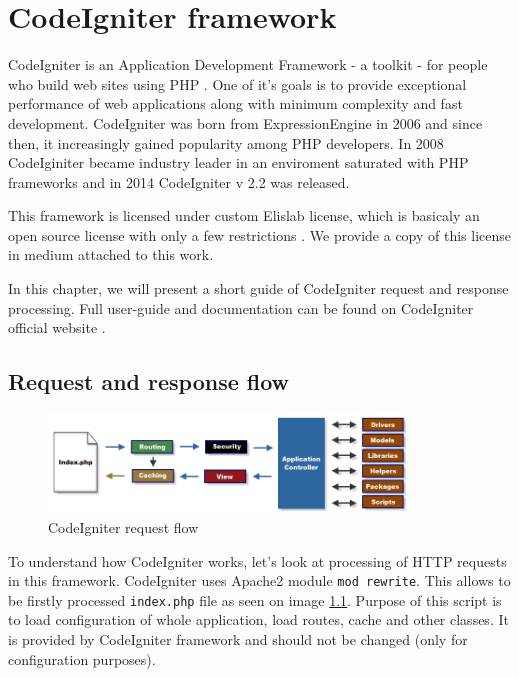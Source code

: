 \chapter{CodeIgniter framework}



CodeIgniter is an Application Development Framework - a toolkit - for people who build web sites using PHP  \cite{codeigniter}. One of it's goals is to provide exceptional performance of web applications along with minimum complexity and fast development. CodeIgniter was born from ExpressionEngine \cite{elislab} in 2006 and since then, it increasingly gained popularity among PHP developers. In 2008 CodeIginiter became industry leader in an enviroment saturated with PHP frameworks \cite{elislab} and in 2014 CodeIgniter v 2.2 was released.


This framework is licensed under custom Elislab license, which is basicaly an open source license with only a few restrictions \cite{elislablicense}. We provide a copy of this license in medium attached to this work.


In this chapter, we will present a short guide of CodeIgniter request and response processing. Full user-guide and documentation can be found on CodeIgniter official website \cite{codeigniter}.

\section{Request and response flow}

\begin{figure}[h]
    \centering
    \includegraphics[width=0.85\textwidth]{images/codeigniter.png}
    \caption{CodeIgniter request flow}
    \label{codeigniter_flow}
\end{figure}


To understand how CodeIgniter works, let's look at processing of HTTP requests in this framework. CodeIgniter uses Apache2  module \texttt{mod rewrite}. This allows to be firstly processed \texttt{index.php} file as seen on image \ref{codeigniter_flow}. Purpose of this script is to load configuration of whole application, load routes, cache and other classes. It is provided by CodeIgniter framework and should not be changed (only for configuration purposes).


